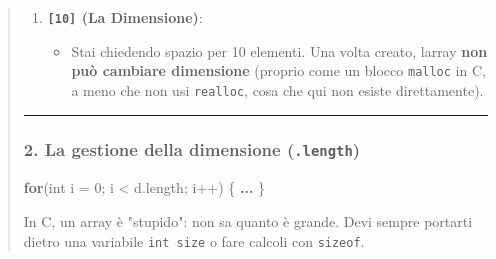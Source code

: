 \documentclass[
]{article}
\newenvironment{Shaded}{}{}
\newcommand{\ControlFlowTok}[1]{\textcolor[rgb]{0.00,0.44,0.13}{\textbf{#1}}}
\newcommand{\DataTypeTok}[1]{\textcolor[rgb]{0.56,0.13,0.00}{#1}}
\newcommand{\DecValTok}[1]{\textcolor[rgb]{0.25,0.63,0.44}{#1}}
\newcommand{\FunctionTok}[1]{\textcolor[rgb]{0.02,0.16,0.49}{#1}}
\newcommand{\KeywordTok}[1]{\textcolor[rgb]{0.00,0.44,0.13}{\textbf{#1}}}
\newcommand{\NormalTok}[1]{#1}
\newcommand{\OperatorTok}[1]{\textcolor[rgb]{0.40,0.40,0.40}{#1}}
\begin{document}
\begin{quote}
\begin{enumerate}
  \begin{itemize}
  \item
    Questa è la parola chiave magica. In C usi \texttt{malloc}. In
    Java/Processing usi \texttt{new}.
  \item
    \textbf{Differenza cruciale:} \texttt{new} non solo alloca la
    memoria nello \emph{Heap}, ma la \textbf{pulisce anche}.
  \item
    Mentre in C un array creato nello stack contiene valori
    "spazzatura", in Processing \texttt{new\ float{[}10{]}} crea 10
    caselle e le riempie tutte automaticamente con
    \textbf{\texttt{0.0}}.
  \end{itemize}
\item
  \textbf{\texttt{{[}10{]}} (La Dimensione)}:

  \begin{itemize}
  \item
    Stai chiedendo spazio per 10 elementi. Una volta creato,
    l\textquotesingle array \textbf{non può cambiare dimensione}
    (proprio come un blocco \texttt{malloc} in C, a meno che non usi
    \texttt{realloc}, cosa che qui non esiste direttamente).
  \end{itemize}
\end{enumerate}

\begin{center}\rule{0.5\linewidth}{0.5pt}\end{center}

\mbox{}%
\subsubsection{\texorpdfstring{2. La gestione della dimensione
(\texttt{.length})}{2. La gestione della dimensione (.length)}}\label{2-la-gestione-della-dimensione-length}

\begin{Shaded}
\begin{Highlighting}[]
\ControlFlowTok{for}\OperatorTok{(}\DataTypeTok{int}\NormalTok{ i }\OperatorTok{=} \DecValTok{0}\OperatorTok{;}\NormalTok{ i }\OperatorTok{\textless{}}\NormalTok{ d}\OperatorTok{.}\FunctionTok{length}\OperatorTok{;}\NormalTok{ i}\OperatorTok{++)} \OperatorTok{\{} \KeywordTok{...} \OperatorTok{\}}
\end{Highlighting}
\end{Shaded}

In C, un array è "stupido": non sa quanto è grande. Devi sempre portarti
dietro una variabile \texttt{int\ size} o fare calcoli con
\texttt{sizeof}.


\end{quote}
\end{document}
